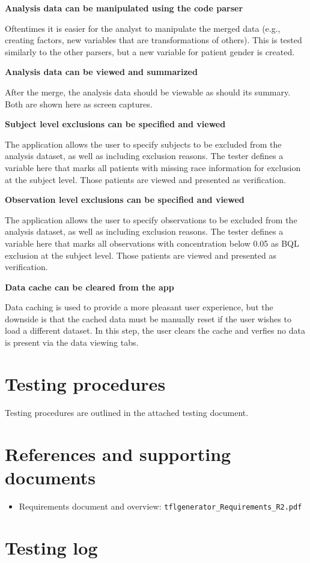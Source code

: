 \documentclass{article}
\newcommand{\testinglog}{data-testing-log.pdf}
\begin{document}
{\bf Analysis data can be manipulated using the code parser}

Oftentimes it is easier for the analyst to manipulate the merged data (e.g., creating factors, new variables that are transformations of others).   This is tested similarly to the other parsers, but a new variable for patient gender is created.

{\bf Analysis data can be viewed and summarized}

After the merge, the analysis data should be viewable as should its summary.  Both are shown here as screen captures.

{\bf Subject level exclusions can be specified and viewed}

The application allows the user to specify subjects to be excluded from the analysis dataset, as well as including exclusion reasons.  The tester defines a variable here that marks all patients with missing race information for exclusion at the subject level.  Those patients are viewed and presented as verification.

{\bf Observation level exclusions can be specified and viewed}

The application allows the user to specify observations to be excluded from the analysis dataset, as well as including exclusion reasons.  The tester defines a variable here that marks all observations with concentration below 0.05 as BQL exclusion at the subject level.  Those patients are viewed and presented as verification.

{\bf Data cache can be cleared from the app}

Data caching is used to provide a more pleasant user experience, but the downside is that the cached data must be manually reset if the user wishes to load a different dataset.  In this step, the user clears the cache and verfies no data is present via the data viewing tabs.

\section*{Testing procedures}

Testing procedures are outlined in the attached testing document.


\section*{References and supporting documents}

\begin{itemize}
 \item Requirements document and overview: \verb=tflgenerator_Requirements_R2.pdf=
\end{itemize}

\section*{Testing log}


\end{document}
